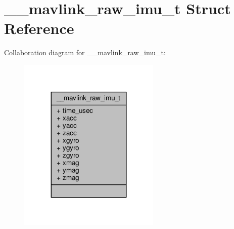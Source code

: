 \hypertarget{struct____mavlink__raw__imu__t}{\section{\+\_\+\+\_\+mavlink\+\_\+raw\+\_\+imu\+\_\+t Struct Reference}
\label{struct____mavlink__raw__imu__t}
}


Collaboration diagram for \+\_\+\+\_\+mavlink\+\_\+raw\+\_\+imu\+\_\+t\+:
\nopagebreak
\begin{figure}[H]
\begin{center}
\leavevmode
\includegraphics[width=191pt]{struct____mavlink__raw__imu__t__coll__graph}
\end{center}
\end{figure}
